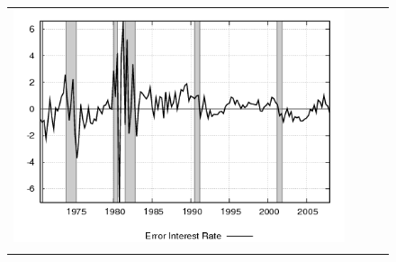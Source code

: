 \begin{figure}
\begin{tabular}{cccc}
\includegraphics[scale=0.22]{results_reallinit/fedfunds_err.png} \\ \\ 
 

\end{tabular}
\end{figure}
